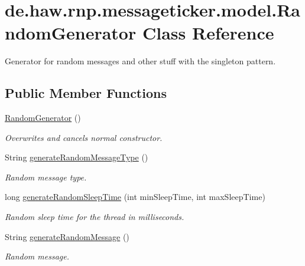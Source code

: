 \hypertarget{classde_1_1haw_1_1rnp_1_1messageticker_1_1model_1_1RandomGenerator}{\section{de.\-haw.\-rnp.\-messageticker.\-model.\-Random\-Generator Class Reference}
\label{classde_1_1haw_1_1rnp_1_1messageticker_1_1model_1_1RandomGenerator}
}


Generator for random messages and other stuff with the singleton pattern.  


\subsection*{Public Member Functions}
\begin{DoxyCompactItemize}
\item 
\hypertarget{classde_1_1haw_1_1rnp_1_1messageticker_1_1model_1_1RandomGenerator_a6ece77ab7f3ecc6a2bfd38fc1b805525}{\hyperlink{classde_1_1haw_1_1rnp_1_1messageticker_1_1model_1_1RandomGenerator_a6ece77ab7f3ecc6a2bfd38fc1b805525}{Random\-Generator} ()}\label{classde_1_1haw_1_1rnp_1_1messageticker_1_1model_1_1RandomGenerator_a6ece77ab7f3ecc6a2bfd38fc1b805525}

\begin{DoxyCompactList}\small\item\em Overwrites and cancels normal constructor. \end{DoxyCompactList}\item 
String \hyperlink{classde_1_1haw_1_1rnp_1_1messageticker_1_1model_1_1RandomGenerator_a5c94e12d07cab557d86dff666e53c73f}{generate\-Random\-Message\-Type} ()
\begin{DoxyCompactList}\small\item\em Random message type. \end{DoxyCompactList}\item 
long \hyperlink{classde_1_1haw_1_1rnp_1_1messageticker_1_1model_1_1RandomGenerator_a25d71afe0223c919e1c64ffa2312a253}{generate\-Random\-Sleep\-Time} (int min\-Sleep\-Time, int max\-Sleep\-Time)
\begin{DoxyCompactList}\small\item\em Random sleep time for the thread in milliseconds. \end{DoxyCompactList}\item 
String \hyperlink{classde_1_1haw_1_1rnp_1_1messageticker_1_1model_1_1RandomGenerator_a49aa630dbb38447457fc2b253bfdfafa}{generate\-Random\-Message} ()
\begin{DoxyCompactList}\small\item\em Random message. \end{DoxyCompactList}\end{DoxyCompactItemize}

